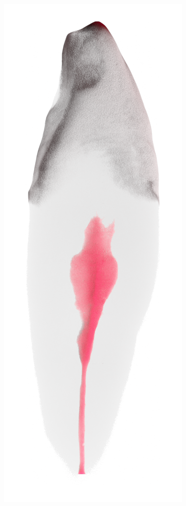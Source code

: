 \begin{frame}
\begin{frame}
		\includegraphics[height=\imageheight]{./images/rcs/Tooth0278}%

\end{frame}
\end{frame}
